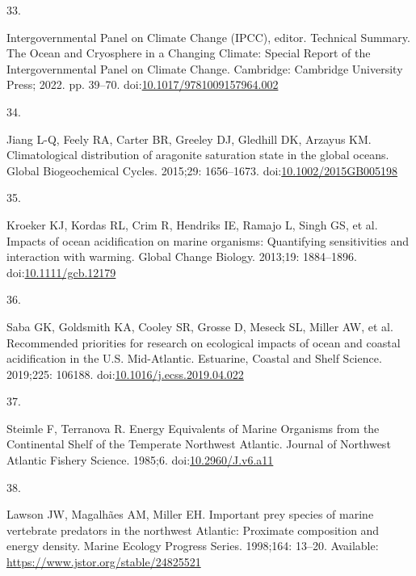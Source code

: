 \documentclass[
  10pt,
]{article}
\newlength{\cslhangindent}
\newlength{\csllabelwidth}
\newlength{\cslentryspacingunit} %
\newenvironment{CSLReferences}[2] %
 {%
  \setlength{\parindent}{0pt}
  \ifodd #1
  \let\oldpar\par
  \def\par{\hangindent=\cslhangindent\oldpar}
  \fi
  \setlength{\parskip}{#2\cslentryspacingunit}
 }%
 {}
\newcommand{\CSLLeftMargin}[1]{\parbox[t]{\csllabelwidth}{#1}}
\newcommand{\CSLRightInline}[1]{\parbox[t]{\linewidth - \csllabelwidth}{#1}\break}
\begin{document}
\begin{CSLReferences}{0}{0}
\leavevmode{}%
\CSLLeftMargin{33. }%
\CSLRightInline{Intergovernmental Panel on Climate Change (IPCC), editor. Technical {Summary}. The {Ocean} and {Cryosphere} in a {Changing} {Climate}: {Special} {Report} of the {Intergovernmental} {Panel} on {Climate} {Change}. Cambridge: Cambridge University Press; 2022. pp. 39--70. doi:\href{https://doi.org/10.1017/9781009157964.002}{10.1017/9781009157964.002}}

\leavevmode{}%
\CSLLeftMargin{34. }%
\CSLRightInline{Jiang L-Q, Feely RA, Carter BR, Greeley DJ, Gledhill DK, Arzayus KM. Climatological distribution of aragonite saturation state in the global oceans. Global Biogeochemical Cycles. 2015;29: 1656--1673. doi:\href{https://doi.org/10.1002/2015GB005198}{10.1002/2015GB005198}}

\leavevmode{}%
\CSLLeftMargin{35. }%
\CSLRightInline{Kroeker KJ, Kordas RL, Crim R, Hendriks IE, Ramajo L, Singh GS, et al. Impacts of ocean acidification on marine organisms: Quantifying sensitivities and interaction with warming. Global Change Biology. 2013;19: 1884--1896. doi:\href{https://doi.org/10.1111/gcb.12179}{10.1111/gcb.12179}}

\leavevmode{}%
\CSLLeftMargin{36. }%
\CSLRightInline{Saba GK, Goldsmith KA, Cooley SR, Grosse D, Meseck SL, Miller AW, et al. Recommended priorities for research on ecological impacts of ocean and coastal acidification in the {U}.{S}. {Mid}-{Atlantic}. Estuarine, Coastal and Shelf Science. 2019;225: 106188. doi:\href{https://doi.org/10.1016/j.ecss.2019.04.022}{10.1016/j.ecss.2019.04.022}}

\leavevmode{}%
\CSLLeftMargin{37. }%
\CSLRightInline{Steimle F, Terranova R. Energy {Equivalents} of {Marine} {Organisms} from the {Continental} {Shelf} of the {Temperate} {Northwest} {Atlantic}. Journal of Northwest Atlantic Fishery Science. 1985;6. doi:\href{https://doi.org/10.2960/J.v6.a11}{10.2960/J.v6.a11}}

\leavevmode{}%
\CSLLeftMargin{38. }%
\CSLRightInline{Lawson JW, Magalhães AM, Miller EH. Important prey species of marine vertebrate predators in the northwest {Atlantic}: Proximate composition and energy density. Marine Ecology Progress Series. 1998;164: 13--20. Available: \url{https://www.jstor.org/stable/24825521}}


\end{CSLReferences}
\end{document}
